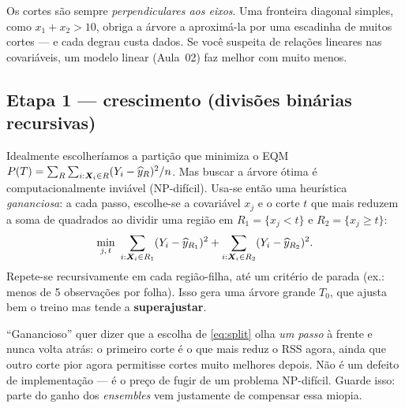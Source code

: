 \documentclass[11pt,a4paper]{article}
\begin{document}
\begin{atencao}
Os cortes são sempre \emph{perpendiculares aos eixos}. Uma fronteira diagonal
simples, como $x_1+x_2 > 10$, obriga a árvore a aproximá-la por uma escadinha de
muitos cortes --- e cada degrau custa dados. Se você suspeita de relações lineares
nas covariáveis, um modelo linear (Aula~02) faz melhor com muito menos.
\end{atencao}

\subsection{Etapa 1 --- crescimento (divisões binárias recursivas)}
Idealmente escolheríamos a partição que minimiza o EQM
$P(T)=\sum_R\sum_{i:\bm{X}_i\in R}(Y_i-\widehat y_R)^2/n$. Mas buscar a árvore ótima é
computacionalmente inviável (NP-difícil). Usa-se então uma heurística
\emph{gananciosa}: a cada passo, escolhe-se a covariável $x_j$ e o corte $t$ que
mais reduzem a soma de quadrados ao dividir uma região em
$R_1=\{x_j<t\}$ e $R_2=\{x_j\ge t\}$:
\begin{equation}\label{eq:split}
  \min_{j,\,t}\ \sum_{i:\bm{X}_i\in R_1}(Y_i-\widehat y_{R_1})^2
            + \sum_{i:\bm{X}_i\in R_2}(Y_i-\widehat y_{R_2})^2 .
\end{equation}
Repete-se recursivamente em cada região-filha, até um critério de parada (ex.: menos
de 5 observações por folha). Isso gera uma árvore grande $T_0$, que ajusta bem o
treino mas tende a \textbf{superajustar}.

\begin{observacao}
``Ganancioso'' quer dizer que a escolha de \eqref{eq:split} olha \emph{um passo}
à frente e nunca volta atrás: o primeiro corte é o que mais reduz o RSS agora, ainda
que outro corte pior agora permitisse cortes muito melhores depois. Não é um defeito
de implementação --- é o preço de fugir de um problema NP-difícil. Guarde isso: parte
do ganho dos \emph{ensembles} vem justamente de compensar essa miopia.
\end{observacao}
\end{document}
